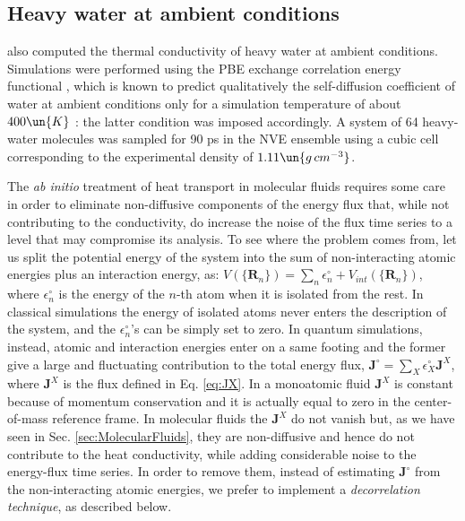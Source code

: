 \subsection{Heavy water at ambient conditions}  \label{sec:Results-water}
\cite{Marcolongo2016} also computed the thermal conductivity of heavy water at ambient conditions. Simulations were performed using the PBE exchange correlation energy functional \citep{Perdew1996}, which is known to predict qualitatively the self-diffusion coefficient of water at ambient conditions only for a simulation temperature of about $400\un{K}$ \citep{Sit-Marzari}: the latter condition was imposed accordingly. A system of 64 heavy-water molecules was sampled for 90 ps in the NVE ensemble using a cubic cell corresponding to the experimental density of $1.11\un{g\,cm^{-3}}$.

The \emph{ab initio} treatment of heat transport in molecular fluids requires some care in order to eliminate non-diffusive components of the energy flux that, while not contributing to the conductivity, do increase the noise of the flux time series to a level that may compromise its analysis. To see where the problem comes from, let us split the potential energy of the system into the sum of non-interacting atomic energies plus an interaction energy, as: $V(\{\mathbf{R}_n\}) = \sum_n\epsilon^\circ_n + V_{int}(\{\mathbf{R}_n\})$, where $\epsilon_n^\circ$ is the energy of the $n$-th atom when it is isolated from the rest. In classical simulations the energy of isolated atoms never enters the description of the system, and the $\epsilon^\circ_n$'s can be simply set to zero. In quantum simulations, instead, atomic and interaction energies enter on a same footing and the former give a large and fluctuating contribution to the total energy flux, $\mathbf{J}^\circ =\sum_X\epsilon^\circ_X \mathbf{J}^X$, where $ \mathbf{J}^X $ is the flux defined in Eq. \eqref{eq:JX}. In a monoatomic fluid $ \mathbf{J}^X $ is constant because of momentum conservation and it is actually equal to zero in the center-of-mass reference frame. In molecular fluids the $ \mathbf{J}^X $ do not vanish but, as we have seen in Sec. \ref{sec:MolecularFluids}, they are non-diffusive and hence do not contribute to the heat conductivity, while adding considerable noise to the energy-flux time series. In order to remove them, instead of estimating $\mathbf{J}^\circ$ from the non-interacting atomic energies, we prefer to implement a \emph{decorrelation technique}, as described below.

